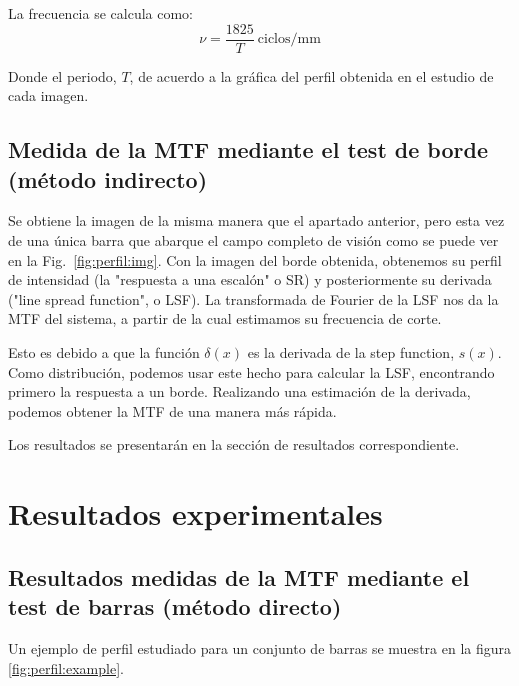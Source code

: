 \documentclass{./packages/optica-article}
\begin{document}
La frecuencia se calcula como:
\nopagebreak
\begin{equation}
	\nu = \frac{1825}{T}\ \textrm{ciclos/mm}\label{eq:frecuencia}
\end{equation}

Donde el periodo, $T$, de acuerdo a la gráfica del perfil obtenida en el estudio de cada imagen.



\subsection{Medida de la MTF mediante el test de borde (método indirecto)}\label{sec:description:indirecto}

Se obtiene la imagen de la misma manera que el apartado anterior, pero esta vez de una única barra que abarque el campo completo de visión como se puede ver en la Fig.~\ref{fig:perfil:img}. Con la imagen del borde obtenida, obtenemos su perfil de intensidad (la "respuesta a una escalón" o SR) y posteriormente su derivada ("line spread function", o LSF). La transformada de Fourier de la LSF nos da la MTF del sistema, a partir de la cual estimamos su frecuencia de corte.

Esto es debido a que la función $\delta(x)$ es la derivada de la step function, $s(x)$. Como distribución, podemos usar este hecho para calcular la LSF, encontrando primero la respuesta a un borde. Realizando una estimación de la derivada, podemos obtener la MTF de una manera más rápida.

Los resultados se presentarán en la sección de resultados correspondiente.





\section{Resultados experimentales}\label{sec:resultados}

\subsection{Resultados medidas de la MTF mediante el test de barras (método directo)}\label{sec:mtf-directo}

Un ejemplo de perfil estudiado para un conjunto de barras se muestra en la figura \ref{fig:perfil:example}.
\end{document}
